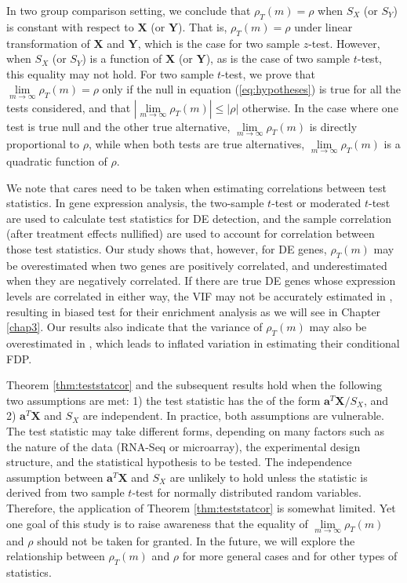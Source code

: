In two group comparison setting, we conclude that $\rho_T(m) = \rho$ when $S_X$ (or $S_Y$) is 
constant with respect to $\bm X$ (or $\bm Y$). That is, $\rho_T(m) = \rho$ under linear 
transformation of $\bm X$ and $\bm Y$, which is the case for two sample $z$-test. However, when 
$S_X$ (or $S_Y$) is a function of $\bm X$ (or $\bm Y$), as is the case of two
sample $t$-test, this equality may not hold. For two sample $t$-test, we prove that 
$\lim\limits_{m\rightarrow\infty}\rho_T(m)=\rho$ only if the null in equation (\ref{eq:hypotheses}) 
is true for all the tests 
considered, and that $|\lim\limits_{m\rightarrow\infty}\rho_T(m)|\leq |\rho|$ otherwise. In the 
case where one test is true null 
and the other true alternative, $\lim\limits_{m\rightarrow\infty}\rho_T(m)$ is directly 
proportional to $\rho$, while when both 
tests are true alternatives, $\lim\limits_{m\rightarrow\infty}\rho_T(m)$ is a quadratic function of 
$\rho$.

We note that cares need to be taken when estimating correlations between test statistics.
In gene expression analysis, the two-sample $t$-test \citep{barry2008statistical, 
	efron2007correlation,qiu2005correlation} or moderated 
$t$-test \citep{wu2012camera} are used to calculate test statistics for DE detection, and the 
sample correlation (after treatment effects 
nullified) are used to account for correlation between those test statistics.
Our study shows that, however, for DE genes, $\rho_T(m)$ may be 
overestimated when
two genes are positively correlated, and underestimated when they are negatively correlated. If 
there are true DE genes whose expression 
levels are correlated in either way, the VIF may not be accurately estimated in 
\citet{wu2012camera}, resulting in biased test
for their enrichment analysis as we will see in Chapter \ref{chap3}. Our results also indicate 
that the variance of 
$\rho_T(m)$ may also be overestimated in
\citet{efron2007correlation}, which leads to inflated variation in estimating their conditional 
FDP.

Theorem \ref{thm:teststatcor} and the subsequent results hold when the following two 
assumptions are met: 1) the test statistic has the of 
the form $\bm a^T\bm X/S_X$, and 2) $\bm a^T\bm X$ and $S_X$ are independent. In practice, both 
assumptions are vulnerable.
The test statistic may take different forms, depending on many factors such as the nature of 
the data (RNA-Seq or microarray), the 
experimental design structure, and the statistical hypothesis to be tested. The independence 
assumption between $\bm a^T\bm X$ and $S_X$ are 
unlikely to hold unless the statistic is derived from two sample $t$-test for normally 
distributed random variables. Therefore, the 
application of Theorem \ref{thm:teststatcor} is somewhat limited. Yet one goal of this study is 
to raise awareness that the equality of $\lim\limits_{m\rightarrow\infty}\rho_T(m)$ 
and $\rho$ should not be taken for granted. In the future, we will explore the relationship 
between $\rho_T(m)$ and $\rho$ for more general cases and for other types of statistics. 

